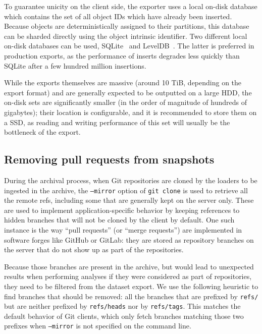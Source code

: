 To guarantee unicity on the client side, the exporter uses a local on-disk
database which contains the set of all object IDs which have already been
inserted. Because objects are deterministically assigned to their partitions,
this database can be sharded directly using the object intrinsic identifier.
Two different local on-disk databases can be used,
SQLite~\cite{owens2006sqlitebook} and LevelDB~\cite{ghemawat2011leveldb}. The
latter is preferred in production exports, as the performance of inserts
degrades less quickly than SQLite after a few hundred million insertions.

While the exports themselves are massive (around 10 TiB, depending on the
export format) and are generally expected to be outputted on a large \gls{HDD},
the on-disk sets are significantly smaller (in the order of magnitude of
hundreds of gigabytes); their location is configurable, and it is recommended
to store them on a \gls{SSD}, as reading and writing performance of this set
will usually be the bottleneck of the export.

\subsection{Removing pull requests from snapshots}

During the archival process, when Git repositories are cloned by the loaders to
be ingested in the archive, the \texttt{--mirror} option of \texttt{git clone}
is used to retrieve all the remote refs, including some that are generally kept
on the server only. These are used to implement application-specific behavior
by keeping references to hidden branches that will not be cloned by the client
by default. One such instance is the way ``pull requests'' (or ``merge
requests'') are implemented in software forges like GitHub or GitLab: they are
stored as repository branches on the server that do not show up as part of the
repositories.

Because those branches are present in the archive, but would lead to unexpected
results when performing analyses if they were considered as part of
repositories, they need to be filtered from the dataset export. We use the
following heuristic to find branches that should be removed: all the branches
that are prefixed by \texttt{refs/} but are neither prefixed by
\texttt{refs/heads} nor by \texttt{refs/tags}. This matches the default
behavior of Git clients, which only fetch branches matching those two prefixes
when \texttt{--mirror} is not specified on the command line.

